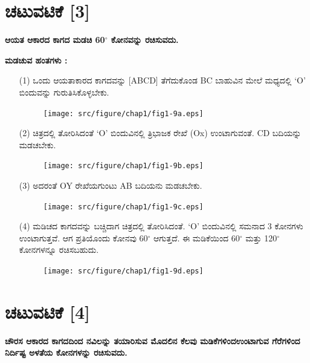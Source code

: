 \section*{ಚಟುವಟಿಕೆ [3]} \textbf{ಆಯತ ಆಕಾರದ ಕಾಗದ ಮಡಚಿ 60$^\circ$ ಕೋನವನ್ನು ರಚಿಸುವದು.}

\textbf{ಮಡಚುವ ಹಂತಗಳು :}
\begin{enumerate}
\item[(1)] ಒಂದು ಆಯತಾಕಾರದ ಕಾಗದವನ್ನು [ABCD] ತೆಗೆದುಕೊಂಡ BC ಬಾಹುವಿನ ಮೇಲೆ ಮಧ್ಯದಲ್ಲಿ `O' ಬಿಂದುವನ್ನು ಗುರುತಿಸಿಕೊಳ್ಳಬೇಕು. 
\begin{figure}[H]
\centering
\texttt{[image: src/figure/chap1/fig1-9a.eps]}
\end{figure}

\item[(2)] ಚಿತ್ರದಲ್ಲಿ ತೋರಿಸಿದಂತೆ  `O' ಬಿಂದುವಿನಲ್ಲಿ ತ್ರಿಭಾಜಕ ರೇಖೆ (Ox) ಉಂಟಾಗುವಂತೆ. CD ಬದಿಯನ್ನು ಮಡಚಬೇಕು.  
\begin{figure}[H]
\centering
\texttt{[image: src/figure/chap1/fig1-9b.eps]}
\end{figure}

\item[(3)] ಅದರಂತೆ OY ರೇಖೆಯಗುಂಟು AB ಬದಿಯನು ಮಡಚಬೇಕು. 
\begin{figure}[H]
\centering
\texttt{[image: src/figure/chap1/fig1-9c.eps]}
\end{figure}

\item[(4)] ಮಡಿಚದ ಕಾಗದವನ್ನು ಬಚ್ಚಿದಾಗ  ಚಿತ್ರದಲ್ಲಿ ತೋರಿಸಿದಂತೆ. `O' ಬಿಂದುವಿನಲ್ಲಿ ಸಮನಾದ 3 ಕೋನಗಳು ಉಂಟಾಗುತ್ತವೆ. ಆಗ ಪ್ರತಿಯೊಂದು ಕೋನವು 60$^\circ$ ಆಗುತ್ತದೆ. ಈ ಮಡಿಕೆಯಿಂದ 60$^\circ$ ಮತ್ತು 120$^\circ$ ಕೋನಗಳನ್ನೂ ರಚಿಸಬಹುದು. 
\begin{figure}[H]
\centering
\texttt{[image: src/figure/chap1/fig1-9d.eps]}
\end{figure}
\end{enumerate}

\section*{ಚಟುವಟಿಕೆ [4]} \textbf{ಚೌರಸ ಆಕಾರದ ಕಾಗದದಿಂದ ನವಿಲನ್ನು ತಯಾರಿಸುವ ಮೊದಲಿನ ಕೆಲವು ಮಡಿಕೆಗಳಿಂದ\break ಉಂಟಾಗುವ ಗೆರೆಗಳಿಂದ ನಿರ್ದಿಷ್ಟ ಅಳತೆಯ ಕೋನಗಳನ್ನು ರಚಿಸುವದು.} 

